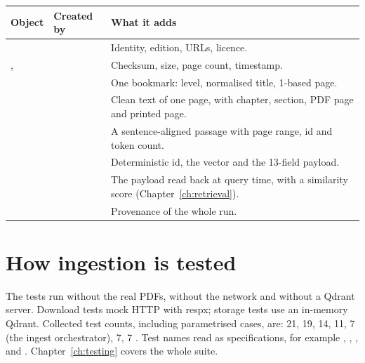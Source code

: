 \begin{center}
\begin{tabularx}{\textwidth}{@{}>{\raggedright\arraybackslash}p{2.9cm}>{\raggedright\arraybackslash}p{3.2cm}L@{}}
\toprule
\textbf{Object} & \textbf{Created by} & \textbf{What it adds}\\
\midrule
{} &  & Identity, edition, URLs, licence.\\
,  &  & Checksum, size, page count, timestamp.\\
 &  & One bookmark: level, normalised title, 1-based page.\\
 &  & Clean text of one page, with chapter, section, PDF page and printed page.\\
 &  & A sentence-aligned passage with page range, id and token count.\\
 &  & Deterministic id, the  vector and the 13-field payload.\\
 &  & The payload read back at query time, with a similarity score (Chapter~\ref{ch:retrieval}).\\
 &  & Provenance of the whole run.\\
\bottomrule
\end{tabularx}
\end{center}

\section{How ingestion is tested}

The tests run without the real PDFs, without the network and without a Qdrant server. Download tests mock HTTP with respx; storage tests use an in-memory Qdrant. Collected test counts, including parametrised cases, are:  21,  19,  14,  11,  7 (the ingest orchestrator),  7,  7 \tagM. Test names read as specifications, for example , , ,  and . Chapter~\ref{ch:testing} covers the whole suite.

